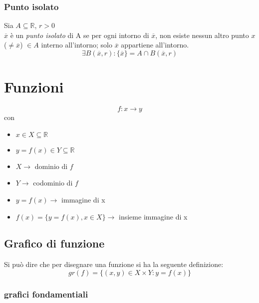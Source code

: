 \documentclass[a4paper,12pt, oneside]{book}
\begin{document}
\subsection{Punto isolato}
\begin{definizione}
	Sia $A \subseteq \mathbb{R}$, $r>0$\\
	$\overline{x}$ è un \emph{punto isolato} di A se per ogni intorno di $\overline{x}$, non esiste nessun altro punto $x$ ($ \neq \overline{x}$) $\in A$ interno all'intorno; solo $\overline{x}$ appartiene all'intorno.
	\begin{equation}
		\exists B(\overline{x}, r) \colon \{\overline{x}\} = A \cap B(\overline{x}, r)
	\end{equation}
\end{definizione}
\chapter{Funzioni}
\begin{equation}
	f: x \rightarrow y
\end{equation}
con
\begin{itemize}
	\item $x \in X \subseteq \mathbb{R}$
	\item $y = f(x) \in Y \subseteq \mathbb{R}$
\end{itemize}
\begin{shaded}
	\begin{itemize}
		\item $X \rightarrow $ dominio di $f$
		\item $Y \rightarrow $ codominio di $f$
		\item $y = f(x) \rightarrow $ immagine di x
		\item $f(x) = \{ y = f(x), x \in X \} \rightarrow $ insieme immagine di x
	\end{itemize}
\end{shaded}
\section{Grafico di funzione}
Si può dire che per disegnare una funzione si ha la seguente definizione: $$gr(f)=\{(x,y)\in X\times Y: y=f(x)\}$$
\subsection{grafici fondamentiali}
\begin{center}
\end{center}
\end{document}
